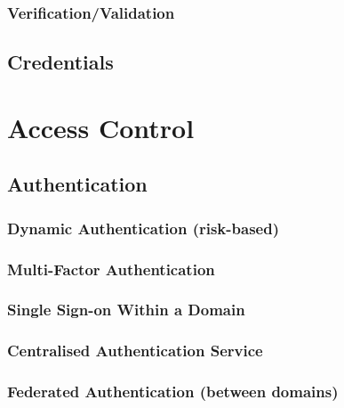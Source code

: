 \hypertarget{verificationvalidation}{%
\subsection{Verification/Validation}\label{verificationvalidation}}

\hypertarget{credentials}{%
\section{Credentials}\label{credentials}}

\hypertarget{access-control}{%
\chapter{Access Control}\label{access-control}}

\hypertarget{authentication}{%
\section{Authentication}\label{authentication}}

\hypertarget{dynamic-authentication-risk-based}{%
\subsection{Dynamic Authentication
(risk-based)}\label{dynamic-authentication-risk-based}}

\hypertarget{multi-factor-authentication}{%
\subsection{Multi-Factor
Authentication}\label{multi-factor-authentication}}

\hypertarget{single-sign-on-within-a-domain}{%
\subsection{Single Sign-on Within a
Domain}\label{single-sign-on-within-a-domain}}

\hypertarget{centralised-authentication-service}{%
\subsection{Centralised Authentication
Service}\label{centralised-authentication-service}}

\hypertarget{federated-authentication-between-domains}{%
\subsection{Federated Authentication (between
domains)}\label{federated-authentication-between-domains}}

